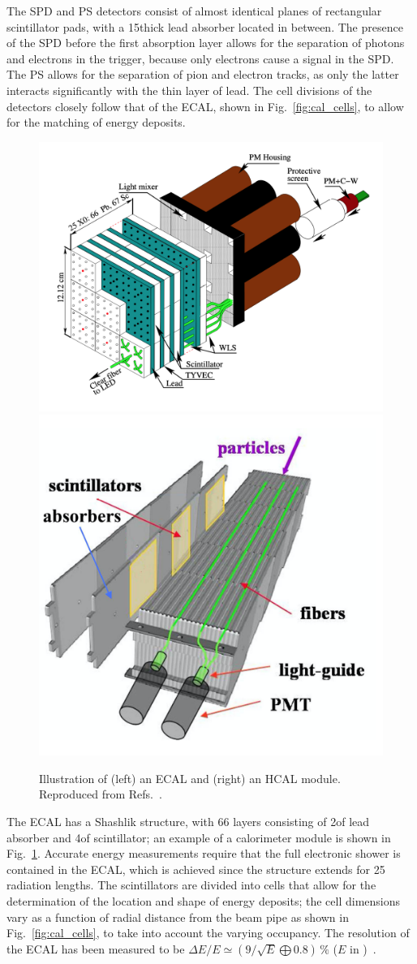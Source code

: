 The SPD and PS detectors consist of almost identical planes of rectangular scintillator pads, with a 15\mm thick lead absorber located in between. The presence of the SPD before the first absorption layer allows for the separation of photons and electrons in the trigger, because only electrons cause a signal in the SPD. The PS allows for the separation of pion and electron tracks, as only the latter interacts significantly with the thin layer of lead. The cell divisions of the detectors closely follow that of the ECAL, shown in Fig.~\ref{fig:cal_cells}, to allow for the matching of energy deposits.

\begin{figure}[tb]
    \centering
    \includegraphics[width=0.55\columnwidth]{figures/detector/ECAL_module.png}
    \includegraphics[width=0.40\columnwidth]{figures/detector/HCAL_module.png}
    \caption{Illustration of (left) an ECAL and (right) an HCAL module. Reproduced from Refs.~\cite{ECALpaper,LHCb-Performance}.}
    \label{fig:ECAL_HCAL_modules}
\end{figure}

The ECAL has a Shashlik structure, with 66 layers consisting of 2\mm of lead absorber and 4\mm of scintillator; an example of a calorimeter module is shown in Fig.~\ref{fig:ECAL_HCAL_modules}. Accurate energy measurements require that the full electronic shower is contained in the ECAL, which is achieved since the structure extends for 25 radiation lengths. The scintillators are divided into cells that allow for the determination of the location and shape of energy deposits; the cell dimensions vary as a function of radial distance from the beam pipe as shown in Fig.~\ref{fig:cal_cells}, to take into account the varying occupancy. The resolution of the ECAL has been measured to be $\Delta E/E \simeq (9/\sqrt{E} \bigoplus 0.8)\,\%$ ($E$ in \gevcc)~\cite{LHCb-detector}.

